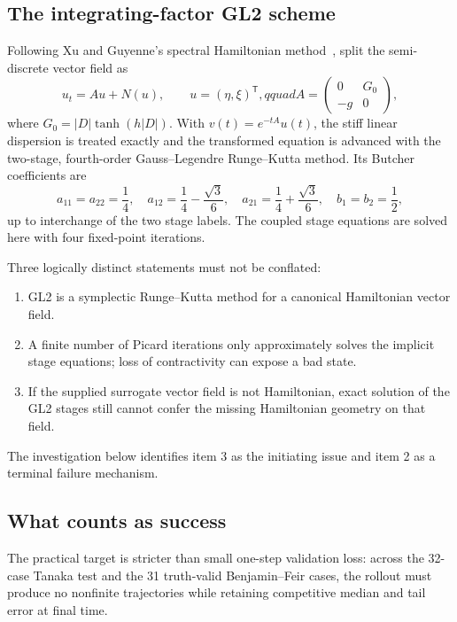 \documentclass[11pt]{article}
\begin{document}
\subsection{The integrating-factor GL2 scheme}

Following Xu and Guyenne's spectral Hamiltonian method~\cite{xu2009}, split the
semi-discrete vector field as
\begin{equation}
 u_t=A u+N(u),\qquad u=(\eta,\xi)^\mathsf{T},qquad
 A=\begin{pmatrix}0&G_0\\-g&0\end{pmatrix},
 \label{eq:split}
\end{equation}
where \(G_0=|D|\tanh(h|D|)\).  With \(v(t)=e^{-tA}u(t)\), the stiff linear
dispersion is treated exactly and the transformed equation is advanced with
the two-stage, fourth-order Gauss--Legendre Runge--Kutta method.  Its Butcher
coefficients are
\begin{equation}
 a_{11}=a_{22}=\frac14,\quad
 a_{12}=\frac14-\frac{\sqrt3}{6},\quad
 a_{21}=\frac14+\frac{\sqrt3}{6},\quad
 b_1=b_2=\frac12,
 \label{eq:gl2-coefficients}
\end{equation}
up to interchange of the two stage labels.  The coupled stage equations are
solved here with four fixed-point iterations.

Three logically distinct statements must not be conflated:
\begin{enumerate}
  \item GL2 is a symplectic Runge--Kutta method for a canonical Hamiltonian
        vector field.
  \item A finite number of Picard iterations only approximately solves the
        implicit stage equations; loss of contractivity can expose a bad state.
  \item If the supplied surrogate vector field is not Hamiltonian, exact
        solution of the GL2 stages still cannot confer the missing Hamiltonian
        geometry on that field.
\end{enumerate}
The investigation below identifies item 3 as the initiating issue and item 2
as a terminal failure mechanism.

\subsection{What counts as success}

The practical target is stricter than small one-step validation loss: across
the 32-case Tanaka test and the 31 truth-valid Benjamin--Feir cases, the rollout
must produce no nonfinite trajectories while retaining competitive median and
tail error at final time.
\end{document}
